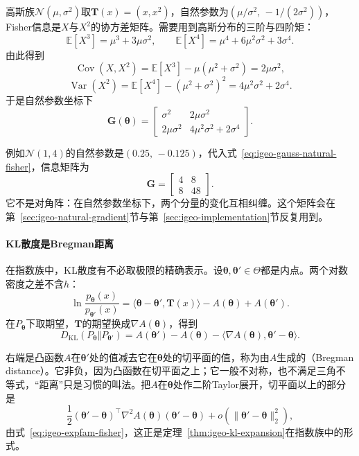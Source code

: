 高斯族$\mathcal{N}(\mu,\sigma^{2})$取$\bm{T}(x)=(x,x^{2})$，自然参数为$(\mu/\sigma^{2},\,-1/(2\sigma^{2}))$，Fisher信息是$X$与$X^{2}$的协方差矩阵。需要用到高斯分布的三阶与四阶矩：
\[
  \mathbb{E}[X^{3}]=\mu^{3}+3\mu\sigma^{2},\qquad\mathbb{E}[X^{4}]=\mu^{4}+6\mu^{2}\sigma^{2}+3\sigma^{4}.
\]
由此得到
\[
  \operatorname{Cov}(X,X^{2})=\mathbb{E}[X^{3}]-\mu(\mu^{2}+\sigma^{2})=2\mu\sigma^{2},
\]
\[
  \operatorname{Var}(X^{2})=\mathbb{E}[X^{4}]-(\mu^{2}+\sigma^{2})^{2}=4\mu^{2}\sigma^{2}+2\sigma^{4}.
\]
于是自然参数坐标下
\begin{equation}
  \bm{G}(\bm{\theta})=\begin{bmatrix}\sigma^{2}&2\mu\sigma^{2}\\2\mu\sigma^{2}&4\mu^{2}\sigma^{2}+2\sigma^{4}\end{bmatrix}.
  \label{eq:igeo-gauss-natural-fisher}
\end{equation}

例如$\mathcal{N}(1,4)$的自然参数是$(0.25,\,-0.125)$，代入式~\eqref{eq:igeo-gauss-natural-fisher}，信息矩阵为
\[
  \bm{G}=\begin{bmatrix}4&8\\8&48\end{bmatrix}.
\]
它不是对角阵：在自然参数坐标下，两个分量的变化互相纠缠。这个矩阵会在第~\ref{sec:igeo-natural-gradient}节与第~\ref{sec:igeo-implementation}节反复用到。

\paragraph{KL散度是Bregman距离}
在指数族中，KL散度有不必取极限的精确表示。设$\bm{\theta},\bm{\theta}'\in\Theta$都是内点。两个对数密度之差不含$h$：
\[
  \ln\frac{p_{\bm{\theta}}(x)}{p_{\bm{\theta}'}(x)}=\langle\bm{\theta}-\bm{\theta}',\bm{T}(x)\rangle-A(\bm{\theta})+A(\bm{\theta}').
\]
在$P_{\bm{\theta}}$下取期望，$\bm{T}$的期望换成$\nabla A(\bm{\theta})$，得到
\begin{equation}
  D_{\mathrm{KL}}(P_{\bm{\theta}}\Vert P_{\bm{\theta}'})=A(\bm{\theta}')-A(\bm{\theta})-\langle\nabla A(\bm{\theta}),\bm{\theta}'-\bm{\theta}\rangle .
  \label{eq:igeo-expfam-bregman}
\end{equation}

右端是凸函数$A$在$\bm{\theta}'$处的值减去它在$\bm{\theta}$处的切平面的值，称为由$A$生成的（Bregman distance）。它非负，因为凸函数在切平面之上；它一般不对称，也不满足三角不等式，“距离”只是习惯的叫法。把$A$在$\bm{\theta}$处作二阶Taylor展开，切平面以上的部分是
\[
  \frac12(\bm{\theta}'-\bm{\theta})^{\top}\nabla^{2}A(\bm{\theta})(\bm{\theta}'-\bm{\theta})+o(\lVert\bm{\theta}'-\bm{\theta}\rVert_2^{2}),
\]
由式~\eqref{eq:igeo-expfam-fisher}，这正是定理~\ref{thm:igeo-kl-expansion}在指数族中的形式。


